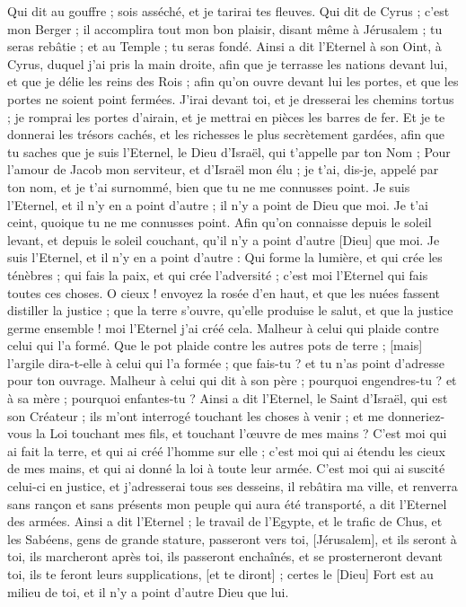 \begin{multicols}{2}
Qui dit au gouffre ; sois asséché, et je tarirai tes fleuves.
Qui dit de Cyrus ; c'est mon Berger ; il accomplira tout mon bon plaisir, disant même à Jérusalem ; tu seras rebâtie ; et au Temple ; tu seras fondé.
\VerseOne{}Ainsi a dit l'Eternel à son Oint, à Cyrus, duquel j'ai pris la main droite, afin que je terrasse les nations devant lui, et que je délie les reins des Rois ; afin qu'on ouvre devant lui les portes, et que les portes ne soient point fermées.
J'irai devant toi, et je dresserai les chemins tortus ; je romprai les portes d'airain, et je mettrai en pièces les barres de fer.
Et je te donnerai les trésors cachés, et les richesses le plus secrètement gardées, afin que tu saches que je suis l'Eternel, le Dieu d'Israël, qui t'appelle par ton Nom ;
Pour l'amour de Jacob mon serviteur, et d'Israël mon élu ; je t'ai, dis-je, appelé par ton nom, et je t'ai surnommé, bien que tu ne me connusses point.
Je suis l'Eternel, et il n'y en a point d'autre ; il n'y a point de Dieu que moi. Je t'ai ceint, quoique tu ne me connusses point.
Afin qu'on connaisse depuis le soleil levant, et depuis le soleil couchant, qu'il n'y a point d'autre [Dieu] que moi. Je suis l'Eternel, et il n'y en a point d'autre :
Qui forme la lumière, et qui crée les ténèbres ; qui fais la paix, et qui crée l'adversité ; c'est moi l'Eternel qui fais toutes ces choses.
O cieux ! envoyez la rosée d'en haut, et que les nuées fassent distiller la justice ; que la terre s'ouvre, qu'elle produise le salut, et que la justice germe ensemble ! moi l'Eternel j'ai créé cela.
Malheur à celui qui plaide contre celui qui l'a formé. Que le pot plaide contre les autres pots de terre ; [mais] l'argile dira-t-elle à celui qui l'a formée ; que fais-tu ? et tu n'as point d'adresse pour ton ouvrage.
Malheur à celui qui dit à son père ; pourquoi engendres-tu ? et à sa mère ; pourquoi enfantes-tu ?
Ainsi a dit l'Eternel, le Saint d'Israël, qui est son Créateur ; ils m'ont interrogé touchant les choses à venir ; et me donneriez-vous la Loi touchant mes fils, et touchant l'œuvre de mes mains ?
C'est moi qui ai fait la terre, et qui ai créé l'homme sur elle ; c'est moi qui ai étendu les cieux de mes mains, et qui ai donné la loi à toute leur armée.
C'est moi qui ai suscité celui-ci en justice, et j'adresserai tous ses desseins, il rebâtira ma ville, et renverra sans rançon et sans présents mon peuple qui aura été transporté, a dit l'Eternel des armées.
Ainsi a dit l'Eternel ; le travail de l'Egypte, et le trafic de Chus, et les Sabéens, gens de grande stature, passeront vers toi, [Jérusalem], et ils seront à toi, ils marcheront après toi, ils passeront enchaînés, et se prosterneront devant toi, ils te feront leurs supplications, [et te diront] ; certes le [Dieu] Fort est au milieu de toi, et il n'y a point d'autre Dieu que lui.

\end{multicols}
